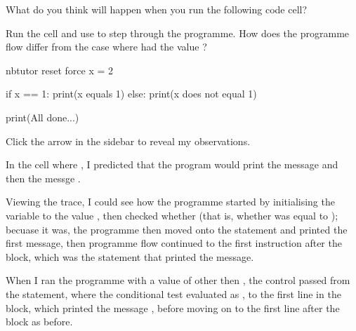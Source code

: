 \documentclass[letterpaper,10pt,english]{sphinxmanual}
\begin{document}

What do you think will happen when you run the following code cell?

Run the cell and use  to step through the programme. How does the programme flow differ from the case where  had the value ?

{
\begin{sphinxVerbatim}[commandchars=\\\{\}]
\llap{\color{nbsphinxin}[ ]:\,\hspace{\fboxrule}\hspace{\fboxsep}}\PYGZpc{}\PYGZpc{}nbtutor \PYGZhy{}\PYGZhy{}reset \PYGZhy{}\PYGZhy{}force
x = 2

if x == 1:
    print(\PYGZdq{}x equals 1\PYGZdq{})
else:
    print(\PYGZdq{}x does not equal 1\PYGZdq{})

print(\PYGZdq{}All done...\PYGZdq{})
\end{sphinxVerbatim}
}

Click the arrow in the sidebar to reveal my observations.

In the cell where , I predicted that the program would print the message  and then the messge .

Viewing the trace, I could see how the programme started by initialising the  variable to the value , then checked whether  (that is, whether  was equal to ); becuase it was, the programme then moved onto the  statement and printed the first message, then programme flow continued to the first instruction after the  block, which was the statement that printed the  message.

When I ran the programme with a value of  other then , the control passed from the  statement, where the conditional test evaluated as , to the first line in the  block, which printed the message , before moving on to the first line after the  block as before.
\end{document}
